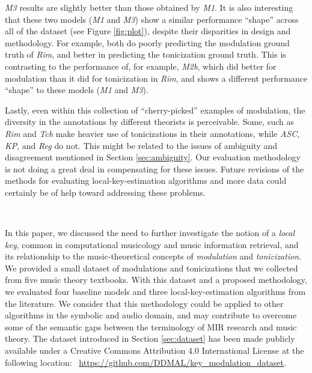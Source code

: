 \emph{M3} results are slightly better than those obtained by
\emph{M1}. It is also interesting that these two models
(\emph{M1} and \emph{M3}) show a similar performance
``shape'' across all of the dataset (see Figure
\ref{fig:plot}), despite their disparities in design and
methodology. For example, both do poorly predicting the
modulation ground truth of \emph{Rim}, and better in
predicting the tonicization ground truth. This is
contrasting to the performance of, for example, \emph{M2b},
which did better for modulation than it did for tonicization
in \emph{Rim}, and shows a different performance ``shape''
to these models (\emph{M1} and \emph{M3}).

Lastly, even within this collection of ``cherry-picked''
examples of modulation, the diversity in the annotations by
different theorists is perceivable. Some, such as \emph{Rim}
and \emph{Tch} make heavier use of tonicizations in their
annotations, while \emph{ASC}, \emph{KP}, and \emph{Reg} do
not. This might be related to the issues of ambiguity and
disagreement mentioned in Section \ref{sec:ambiguity}. Our
evaluation methodology is not doing a great deal in
compensating for these issues. Future revisions of the
methods for evaluating local-key-estimation algorithms and
more data could certainly be of help toward addressing these
problems.

~\label{sec:discussion}

In this paper, we discussed the need to further investigate
the notion of a \emph{local key}, common in computational
musicology and music information retrieval, and its
relationship to the music-theoretical concepts of
\emph{modulation} and \emph{tonicization}. We provided a
small dataset of modulations and tonicizations that we
collected from five music theory textbooks. With this
dataset and a proposed methodology, we evaluated four
baseline models and three local-key-estimation algorithms
from the literature. We consider that this methodology could
be applied to other algorithms in the symbolic and audio
domain, and may contribute to overcome some of the semantic
gaps between the terminology of MIR research and music
theory. The dataset introduced in Section \ref{sec:dataset}
has been made publicly available under a Creative Commons
Attribution 4.0 International License at the following
location:
~\url{https://github.com/DDMAL/key_modulation_dataset}.
